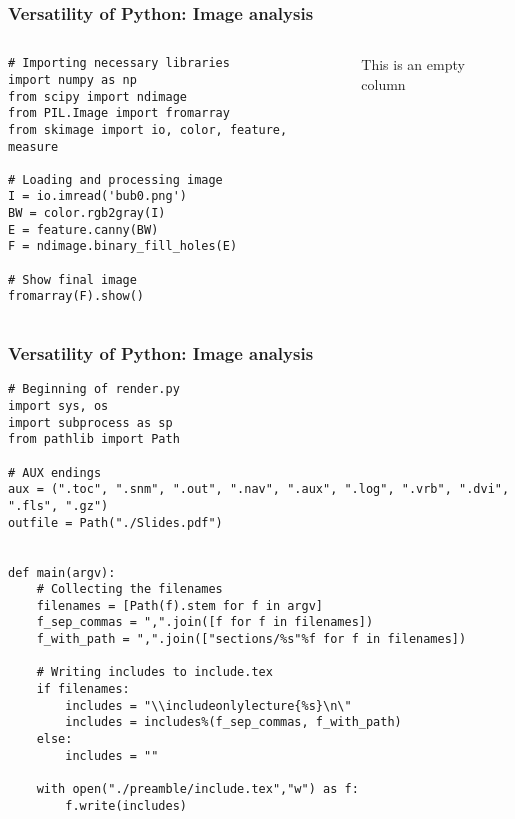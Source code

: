 \begin{frame}[fragile]
\frametitle{Versatility of Python: Image analysis}
\begin{columns}
\begin{lstlisting}
# Importing necessary libraries
import numpy as np
from scipy import ndimage
from PIL.Image import fromarray
from skimage import io, color, feature, measure

# Loading and processing image 
I = io.imread('bub0.png')
BW = color.rgb2gray(I)
E = feature.canny(BW) 
F = ndimage.binary_fill_holes(E)

# Show final image
fromarray(F).show()
\end{lstlisting}  
  \vfill
    This is an empty column
\end{columns}
\end{frame}

\begin{frame}[fragile]
\frametitle{Versatility of Python: Image analysis}
\begin{lstlisting}
# Beginning of render.py
import sys, os
import subprocess as sp
from pathlib import Path 

# AUX endings
aux = (".toc", ".snm", ".out", ".nav", ".aux", ".log", ".vrb", ".dvi", ".fls", ".gz")
outfile = Path("./Slides.pdf")


def main(argv):
    # Collecting the filenames 
    filenames = [Path(f).stem for f in argv]
    f_sep_commas = ",".join([f for f in filenames])
    f_with_path = ",".join(["sections/%s"%f for f in filenames])

    # Writing includes to include.tex
    if filenames:
        includes = "\\includeonlylecture{%s}\n\"
        includes = includes%(f_sep_commas, f_with_path)
    else:
        includes = ""

    with open("./preamble/include.tex","w") as f:
        f.write(includes)
\end{lstlisting}  
\end{frame}

